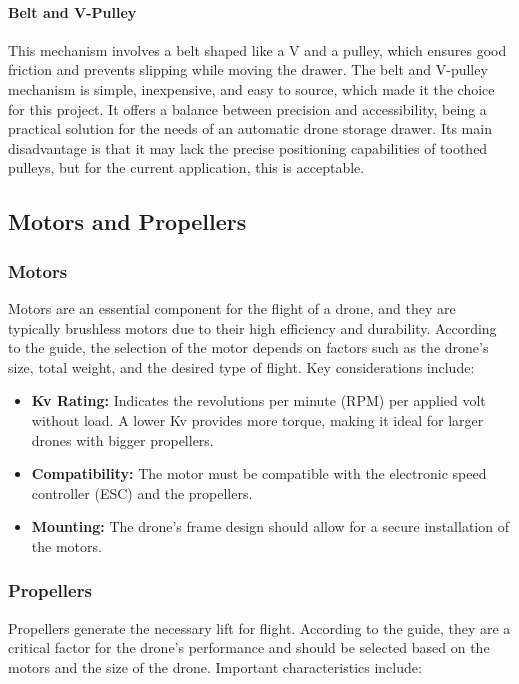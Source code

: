     \paragraph{Belt and V-Pulley} This mechanism involves a belt shaped like a V and a pulley, which ensures good friction and prevents slipping while moving the drawer. The belt and V-pulley mechanism is simple, inexpensive, and easy to source, which made it the choice for this project. It offers a balance between precision and accessibility, being a practical solution for the needs of an automatic drone storage drawer. Its main disadvantage is that it may lack the precise positioning capabilities of toothed pulleys, but for the current application, this is acceptable.

    
\subsection{Motors and Propellers}

    \subsubsection{Motors}
    
    Motors are an essential component for the flight of a drone, and they are typically brushless motors due to their high efficiency and durability. According to the guide, the selection of the motor depends on factors such as the drone's size, total weight, and the desired type of flight. Key considerations include:
    
    \begin{itemize}
        \item \textbf{Kv Rating:} Indicates the revolutions per minute (RPM) per applied volt without load. A lower Kv provides more torque, making it ideal for larger drones with bigger propellers.
        \item \textbf{Compatibility:} The motor must be compatible with the electronic speed controller (ESC) and the propellers.
        \item \textbf{Mounting:} The drone's frame design should allow for a secure installation of the motors.
    \end{itemize}
    
    \subsubsection{Propellers}
    
    Propellers generate the necessary lift for flight. According to the guide, they are a critical factor for the drone's performance and should be selected based on the motors and the size of the drone. Important characteristics include:
    
